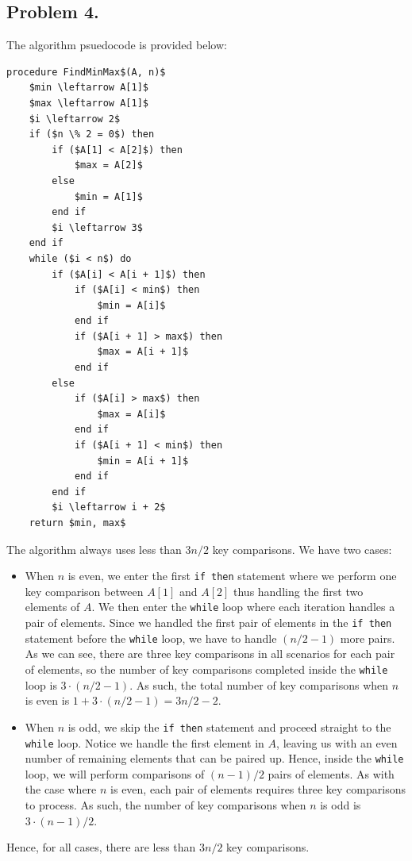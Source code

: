 \documentclass[11pt, letterpaper, titlepage]{article}
\begin{document}
\newpage
\subsection*{Problem 4.}
The algorithm psuedocode is provided below:
\begin{lstlisting}
procedure FindMinMax$(A, n)$
    $min \leftarrow A[1]$
    $max \leftarrow A[1]$
    $i \leftarrow 2$
    if ($n \% 2 = 0$) then
        if ($A[1] < A[2]$) then
            $max = A[2]$
        else
            $min = A[1]$
        end if
        $i \leftarrow 3$
    end if
    while ($i < n$) do 
        if ($A[i] < A[i + 1]$) then
            if ($A[i] < min$) then
                $min = A[i]$
            end if
            if ($A[i + 1] > max$) then
                $max = A[i + 1]$
            end if
        else
            if ($A[i] > max$) then 
                $max = A[i]$
            end if 
            if ($A[i + 1] < min$) then
                $min = A[i + 1]$
            end if
        end if
        $i \leftarrow i + 2$
    return $min, max$
\end{lstlisting}

The algorithm always uses less than $3n/2$ key comparisons. We have two cases:
\begin{itemize}
    \item When $n$ is even, we enter the first \lstinline{if then} statement where we perform one key comparison between $A[1]$ and $A[2]$ thus handling the first two elements of $A$. We then enter the \lstinline{while} loop where each iteration handles a pair of elements. Since we handled the first pair of elements in the \lstinline{if then} statement before the \lstinline{while} loop, we have to handle $(n/2 - 1)$ more pairs. As we can see, there are three key comparisons in all scenarios for each pair of elements, so the number of key comparisons completed inside the \lstinline{while} loop is $3 \cdot (n/2 - 1)$. As such, the total number of key comparisons when $n$ is even is $1 + 3 \cdot (n/2 - 1) = 3n/2 - 2$.
    \item When $n$ is odd, we skip the \lstinline{if then} statement and proceed straight to the \lstinline{while} loop. Notice we handle the first element in $A$, leaving us with an even number of remaining elements that can be paired up. Hence, inside the \lstinline{while} loop, we will perform comparisons of $(n - 1)/2$ pairs of elements. As with the case where $n$ is even, each pair of elements requires three key comparisons to process. As such, the number of key comparisons when $n$ is odd is $3 \cdot (n-1)/2$.
\end{itemize}
Hence, for all cases, there are less than $3n/2$ key comparisons.
\end{document}
